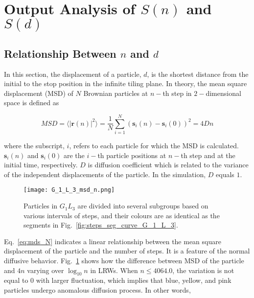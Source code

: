 \section{Output Analysis of $S(n)$ and $S(d)$}



\subsection{Relationship Between $n$ and $d$}


In this section, the displacement of a particle, $d$, is the shortest
distance from the initial to the stop position in the infinite tiling
plane. In theory, the mean square displacement (MSD) of $N$ Brownian
particles at $n-$th step in $2-$dimensional space is defined as

     \begin{equation}\label{eq:mds_N}
       MSD = \langle \lvert \bm{r}(n) \lvert^2 \rangle = \frac{1}{N} \sum^{N}_{i=1} (\bm{s}_{i}(n) - \bm{s}_{i}(0))^2 = 4Dn
     \end{equation}
     
where the subscript, $i$, refers to each particle for which the MSD is
calculated. $\bm{s}_{i}(n)$ and $\bm{s}_{i}(0)$ are the $i-$th
particle positions at $n-$th step and at the initial time,
respectively. $D$ is diffusion coefficient which is related to the
variance of the independent displacements of the particle. In the
simulation, $D$ equals $1$.
     
      
      \begin{figure}
         \centering
         \texttt{[image: G\_1\_L\_3\_msd\_n.png]}
         \caption{Particles in $G_1L_3$ are divided into several
           subgroups based on various intervals of steps, and their
           colours are as identical as the segments in
           Fig.~\ref{fig:steps_seg_curve_G_1_L_3}.}
         \label{fig:G_1_L_3_msd_n}
      \end{figure}


Eq.~\ref{eq:mds_N} indicates a linear relationship between the mean
square displacement of the particle and the number of steps. It is a
feature of the normal diffusive behavior. Fig.~\ref{fig:G_1_L_3_msd_n}
shows how the difference between MSD of the particle and $4n$ varying
over $\log_{10}n$ in LRWs. When $n \leq 4064.0$, the variation is not
equal to $0$ with larger fluctuation, which implies that blue, yellow,
and pink particles undergo anomalous diffusion process. In other
words,

